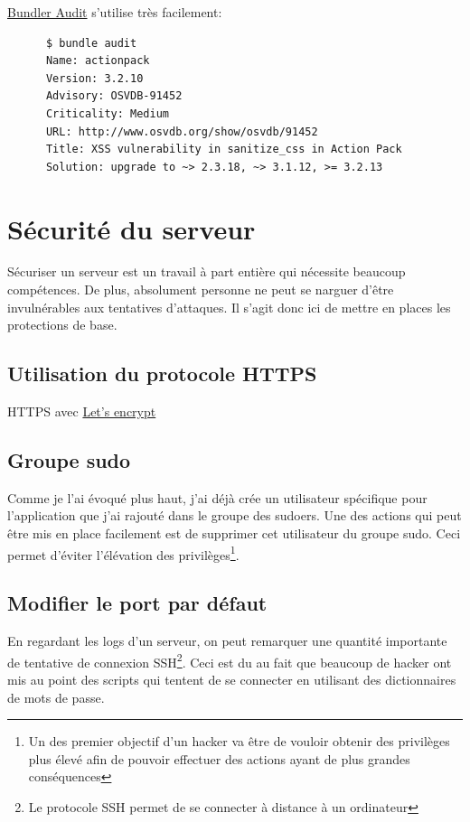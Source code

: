 \documentclass[]{report}
\begin{document}
      \href{https://github.com/rubysec/bundler-audit}{Bundler Audit} s'utilise très facilement:

      \begin{scriptsize}
      \begin{verbatim}
      $ bundle audit
      Name: actionpack
      Version: 3.2.10
      Advisory: OSVDB-91452
      Criticality: Medium
      URL: http://www.osvdb.org/show/osvdb/91452
      Title: XSS vulnerability in sanitize_css in Action Pack
      Solution: upgrade to ~> 2.3.18, ~> 3.1.12, >= 3.2.13
      \end{verbatim}
      \end{scriptsize}


  \section{Sécurité du serveur}

    Sécuriser un serveur est un travail à part entière qui nécessite beaucoup compétences. De plus, absolument personne ne peut se narguer d'être invulnérables aux tentatives d'attaques. Il s'agit donc ici de mettre en places les protections de base.

    \subsection{Utilisation du protocole HTTPS}

      HTTPS avec \href{https://letsencrypt.org/}{Let's encrypt}

    \subsection{Groupe sudo}

      Comme je l'ai évoqué plus haut, j'ai déjà crée un utilisateur spécifique pour l'application que j'ai rajouté dans le groupe des sudoers. Une des actions qui peut être mis en place facilement est de supprimer cet utilisateur du groupe sudo. Ceci permet d'éviter l’élévation des privilèges\footnote{Un des premier objectif d'un hacker va être de vouloir obtenir des privilèges plus élevé afin de pouvoir effectuer des actions ayant de plus grandes conséquences}.

    \subsection{Modifier le port par défaut}

      En regardant les logs d'un serveur, on peut remarquer une quantité importante de tentative de connexion SSH\footnote{Le protocole SSH permet de se connecter à distance à un ordinateur}. Ceci est du au fait que beaucoup de hacker ont mis au point des scripts qui tentent de se connecter en utilisant des dictionnaires de mots de passe.
\end{document}
